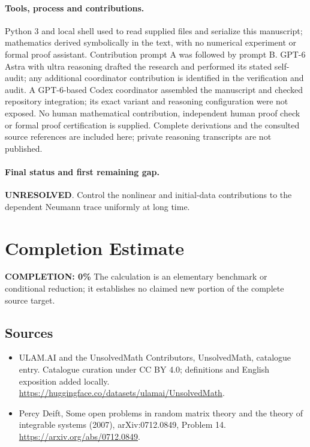 \documentclass[11pt]{article}
\begin{document}
\paragraph{Tools, process and contributions.}
Python 3 and local shell used to read supplied files and serialize this manuscript; mathematics derived symbolically in the text, with no numerical experiment or formal proof assistant. Contribution prompt A was followed by prompt B. GPT-6 Astra with ultra reasoning drafted the research and performed its stated self-audit; any additional coordinator contribution is identified in the verification and audit. A GPT-6-based Codex coordinator assembled the manuscript and checked repository integration; its exact variant and reasoning configuration were not exposed. No human mathematical contribution, independent human proof check or formal proof certification is supplied. Complete derivations and the consulted source references are included here; private reasoning transcripts are not published.

\paragraph{Final status and first remaining gap.}
\textbf{UNRESOLVED}. Control the nonlinear and initial-data contributions to the dependent Neumann trace uniformly at long time.

\section{Completion Estimate}
\noindent\textbf{COMPLETION: 0\%}
The calculation is an elementary benchmark or conditional reduction; it establishes no claimed new portion of the complete source target.

\subsection{Sources}
\begin{itemize}
\item[\hypertarget{source:statement:1}{S1}] ULAM.AI and the UnsolvedMath Contributors, UnsolvedMath, catalogue entry. Catalogue curation under CC BY 4.0; definitions and English exposition added locally.
\url{https://huggingface.co/datasets/ulamai/UnsolvedMath}.
\item[\hypertarget{source:statement:2}{S2}] Percy Deift, Some open problems in random matrix theory and the theory of integrable systems (2007), arXiv:0712.0849, Problem 14.
\url{https://arxiv.org/abs/0712.0849}.
\end{itemize}
\label{end:statement}
\end{document}
